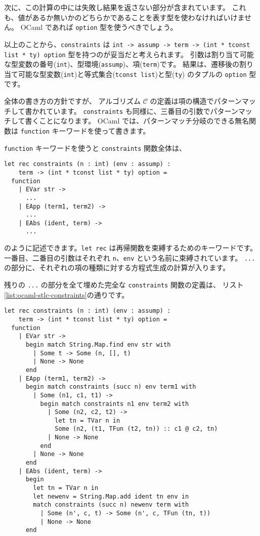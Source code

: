 次に、この計算の中には失敗し結果を返さない部分が含まれています。
これも、値があるか無いかのどちらかであることを表す型を使わなければいけません。
OCaml であれば \texttt{option} 型を使うべきでしょう。

以上のことから、\texttt{constraints} は
\texttt{int -> assump -> term -> (int * tconst list * ty) option} 型を持つのが妥当だと考えられます。
引数は割り当て可能な型変数の番号(\texttt{int})、型環境(\texttt{assump})、項(\texttt{term})です。
結果は、遷移後の割り当て可能な型変数(\texttt{int})と等式集合(\texttt{tconst list})と型(\texttt{ty})
のタプルの \texttt{option} 型です。

全体の書き方の方針ですが、
アルゴリズム $\mathcal C$ の定義は項の構造でパターンマッチして書かれています。
\texttt{constraints} も同様に、三番目の引数でパターンマッチして書くことになります。
OCaml では、パターンマッチ分岐のできる無名関数は \texttt{function} キーワードを使って書きます。

\texttt{function} キーワードを使うと \texttt{constraints} 関数全体は、
\begin{lstlisting}
let rec constraints (n : int) (env : assump) :
    term -> (int * tconst list * ty) option =
  function
    | EVar str ->
      ...
    | EApp (term1, term2) ->
      ...
    | EAbs (ident, term) ->
      ...
\end{lstlisting}
のように記述できます。\texttt{let rec} は再帰関数を束縛するためのキーワードです。
一番目、二番目の引数はそれぞれ \texttt{n}、\texttt{env} という名前に束縛されています。
\texttt{...} の部分に、それぞれの項の種類に対する方程式生成の計算が入ります。

残りの \texttt{...} の部分を全て埋めた完全な \texttt{constraints} 関数の定義は、
リスト\ref{list:ocaml-stlc-constraints}の通りです。

\begin{lstlisting}[caption=方程式の生成, label=list:ocaml-stlc-constraints]
let rec constraints (n : int) (env : assump) :
    term -> (int * tconst list * ty) option =
  function
    | EVar str ->
      begin match String.Map.find env str with
        | Some t -> Some (n, [], t)
        | None -> None
      end
    | EApp (term1, term2) ->
      begin match constraints (succ n) env term1 with
        | Some (n1, c1, t1) ->
          begin match constraints n1 env term2 with
            | Some (n2, c2, t2) ->
              let tn = TVar n in
              Some (n2, (t1, TFun (t2, tn)) :: c1 @ c2, tn)
            | None -> None
          end
        | None -> None
      end
    | EAbs (ident, term) ->
      begin
        let tn = TVar n in
        let newenv = String.Map.add ident tn env in
        match constraints (succ n) newenv term with
          | Some (n', c, t) -> Some (n', c, TFun (tn, t))
          | None -> None
      end
\end{lstlisting}

